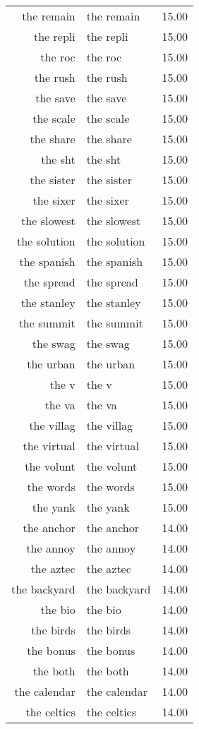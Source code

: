 \begin{table}[ht]
\begin{tabular}{rlr}
  the remain & the remain & 15.00 \\ 
  the repli & the repli & 15.00 \\ 
  the roc & the roc & 15.00 \\ 
  the rush & the rush & 15.00 \\ 
  the save & the save & 15.00 \\ 
  the scale & the scale & 15.00 \\ 
  the share & the share & 15.00 \\ 
  the sht & the sht & 15.00 \\ 
  the sister & the sister & 15.00 \\ 
  the sixer & the sixer & 15.00 \\ 
  the slowest & the slowest & 15.00 \\ 
  the solution & the solution & 15.00 \\ 
  the spanish & the spanish & 15.00 \\ 
  the spread & the spread & 15.00 \\ 
  the stanley & the stanley & 15.00 \\ 
  the summit & the summit & 15.00 \\ 
  the swag & the swag & 15.00 \\ 
  the urban & the urban & 15.00 \\ 
  the v & the v & 15.00 \\ 
  the va & the va & 15.00 \\ 
  the villag & the villag & 15.00 \\ 
  the virtual & the virtual & 15.00 \\ 
  the volunt & the volunt & 15.00 \\ 
  the words & the words & 15.00 \\ 
  the yank & the yank & 15.00 \\ 
  the anchor & the anchor & 14.00 \\ 
  the annoy & the annoy & 14.00 \\ 
  the aztec & the aztec & 14.00 \\ 
  the backyard & the backyard & 14.00 \\ 
  the bio & the bio & 14.00 \\ 
  the birds & the birds & 14.00 \\ 
  the bonus & the bonus & 14.00 \\ 
  the both & the both & 14.00 \\ 
  the calendar & the calendar & 14.00 \\ 
  the celtics & the celtics & 14.00 \\ 

\end{tabular}
\end{table}
